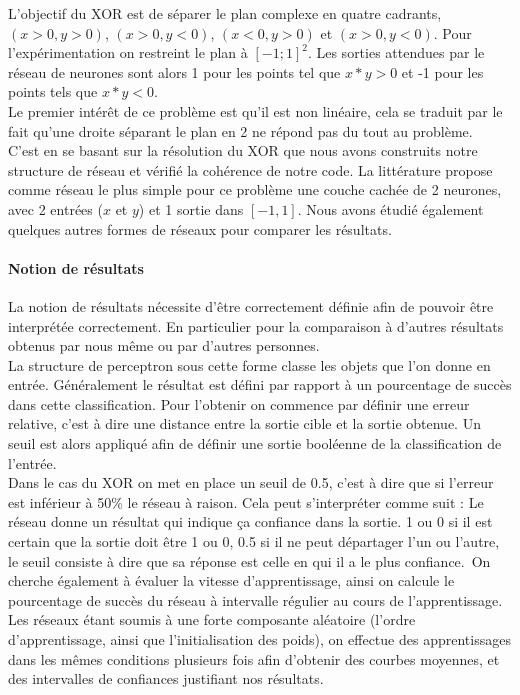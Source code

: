 L'objectif du XOR est de séparer le plan complexe en quatre cadrants, $(x >0, y > 0)$, $ (x>0, y<0)$, $ (x<0, y>0)$ et $ (x>0, y<0) $. Pour l'expérimentation on restreint le plan à $[-1;1]^2$. Les sorties attendues par le réseau de neurones sont alors 1 pour les points tel que $x*y > 0 $ et -1 pour les points tels que $x*y<0$. \\
Le premier intérêt de ce problème est qu'il est non linéaire, cela se traduit par le fait qu'une droite séparant le plan en 2 ne répond pas du tout au problème.\\

C'est en se basant sur la résolution du XOR que nous avons construits notre structure de réseau et vérifié la cohérence de notre code. La littérature propose comme réseau le plus simple pour ce problème une couche cachée de 2 neurones, avec 2 entrées ($x$ et $y$) et 1 sortie dans $[-1, 1]$. Nous avons étudié également quelques autres formes de réseaux pour comparer les résultats.

\paragraph{Notion de résultats} %
\label{par:notion_de_resultats}
La notion de résultats nécessite d'être correctement définie afin de pouvoir être interprétée correctement. En particulier pour la comparaison à d'autres résultats obtenus par nous même ou par d'autres personnes. \\
La structure de perceptron sous cette forme classe les objets que l'on donne en entrée. Généralement le résultat est défini par rapport à un pourcentage de succès dans cette classification. Pour l'obtenir on commence par définir une erreur relative, c'est à dire une distance entre la sortie cible et la sortie obtenue. Un seuil est alors appliqué afin de définir une sortie booléenne de la classification de l'entrée.\\
Dans le cas du XOR on met en place un seuil de 0.5, c'est à dire que si l'erreur est inférieur à 50\% le réseau à raison. Cela peut s’interpréter comme suit : Le réseau donne un résultat qui indique ça confiance dans la sortie. 1 ou 0 si il est certain que la sortie doit être 1 ou 0, 0.5 si il ne peut départager l'un ou l'autre, le seuil consiste à dire que sa réponse est celle en qui il a le plus confiance.\
On cherche également à évaluer la vitesse d'apprentissage, ainsi on calcule le pourcentage de succès du réseau à intervalle régulier au cours de l'apprentissage. Les réseaux étant soumis à une forte composante aléatoire (l'ordre d'apprentissage, ainsi que l'initialisation des poids), on effectue des apprentissages dans les mêmes conditions plusieurs fois afin d'obtenir des courbes moyennes, et des intervalles de confiances justifiant nos résultats.

